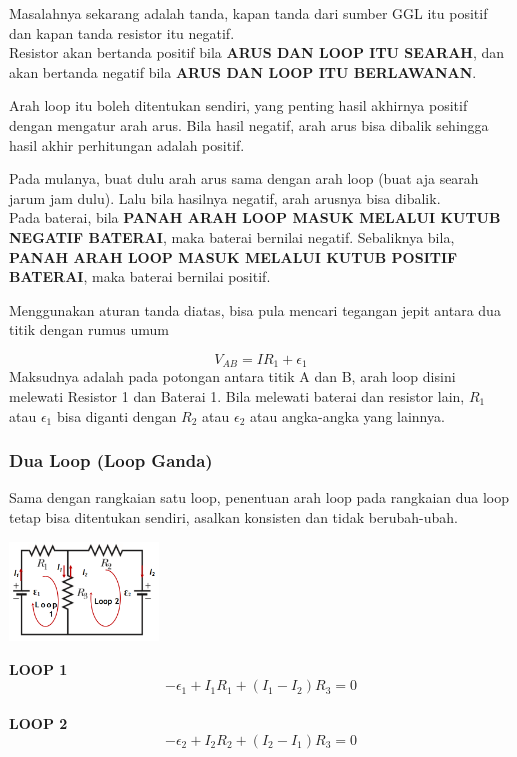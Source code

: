 \documentclass[twocolumn, 11pt]{article}%
\begin{document}
    Masalahnya sekarang adalah tanda, kapan tanda dari sumber GGL itu positif dan kapan tanda resistor itu negatif.\\

    Resistor akan bertanda positif bila \textbf{ARUS DAN LOOP ITU SEARAH}, dan akan bertanda negatif bila \textbf{ARUS DAN LOOP ITU BERLAWANAN}.

    Arah loop itu boleh ditentukan sendiri, yang penting hasil akhirnya positif dengan mengatur arah arus. Bila hasil negatif, arah arus bisa dibalik sehingga hasil akhir perhitungan adalah positif.

    Pada mulanya, buat dulu arah arus sama dengan arah loop (buat aja searah jarum jam dulu). Lalu bila hasilnya negatif, arah arusnya bisa dibalik.\\

    Pada baterai, bila \textbf{PANAH ARAH LOOP MASUK MELALUI KUTUB NEGATIF BATERAI}, maka baterai bernilai negatif. Sebaliknya bila, \textbf{PANAH ARAH LOOP MASUK MELALUI KUTUB POSITIF BATERAI}, maka baterai bernilai positif.

    Menggunakan aturan tanda diatas, bisa pula mencari tegangan jepit antara dua titik dengan rumus umum

    \[V_{AB} = IR_1 + \epsilon_1 \]
    Maksudnya adalah pada potongan antara titik A dan B, arah loop disini melewati Resistor 1 dan Baterai 1. Bila melewati baterai dan resistor lain, $R_1$ atau $\epsilon_1$ bisa diganti dengan $R_2$ atau $\epsilon_2$ atau angka-angka yang lainnya.

    \subsubsection{Dua Loop (Loop Ganda)}%
    Sama dengan rangkaian satu loop, penentuan arah loop pada rangkaian dua loop tetap bisa ditentukan sendiri, asalkan konsisten dan tidak berubah-ubah. 
    \begin{center}
        \includegraphics[width=150px]{3.png}
    \end{center}
    
    \textbf{LOOP 1}\\
    \[ -\epsilon_1 + I_1R_1 + (I_1-I_2)R_3=0\]
    \paragraph{}\textbf{LOOP 2}\\
    \[ -\epsilon_2 + I_2R_2 + (I_2-I_1)R_3=0\]
\end{document}
